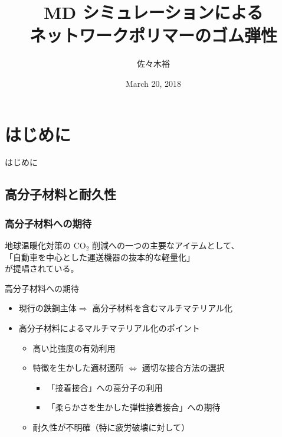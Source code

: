 \documentclass[11pt, dvipdfmx]{beamer}
\title
[MD シミュレーションによるネットワークポリマーのゴム弾性]
{MD シミュレーションによる\\ネットワークポリマーのゴム弾性}
\author[東亞合成　佐々木、大村]{佐々木裕}
\institute[東亞合成]{東亞合成}
\date{March 20, 2018}
\begin{document}
\begin{frame}\frametitle{}
	\titlepage
\end{frame}



\section{はじめに}
\begin{frame}
\LARGE{はじめに}
\end{frame}


\subsection{高分子材料と耐久性}

\begin{frame}
\frametitle{高分子材料への期待}

地球温暖化対策の CO$_2$ 削減への一つの主要なアイテムとして、\\
{\Large
{\color{red}「自動車を中心とした運送機器の抜本的な軽量化」}
}\\
が提唱されている。
\begin{block}{高分子材料への期待}
	\begin{itemize}
	\item
	現行の鉄鋼主体$ \Rightarrow$ 高分子材料を含むマルチマテリアル化
	
	\item
	高分子材料によるマルチマテリアル化のポイント
		\begin{itemize}
		\item
		高い比強度の有効利用
		\item
		特徴を生かした適材適所 $\Leftrightarrow$ 適切な接合方法の選択
			\begin{itemize}
			\item
			{\color{red} 「接着接合」への高分子の利用}
			\item
			{\color{red} 「柔らかさを生かした弾性接着接合」への期待}
			\end{itemize}
		\item
		{\color{blue}耐久性が不明確（特に疲労破壊に対して）}
		\end{itemize}
	\end{itemize}
\end{block}
\end{frame}
\end{document}
